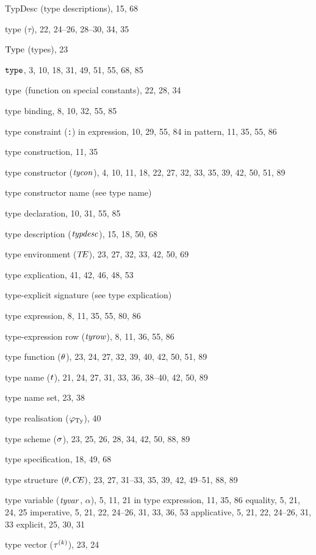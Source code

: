 \begin{theindex}
\item TypDesc (type descriptions), 15, 68
\item type ($\tau$), 22, 24--26, 28--30, 34, 35
\item ${\rm Type}$ (types), 23
\item ${\tt type}$, 3, 10, 18, 31, 49, 51, 55, 68, 85
\item $\mathop{\rm type}\nolimits$ (function on special constants), 22, 28, 34
\item type binding, 8, 10, 32, 55, 85
\item type constraint (\verb+:+) 
\subitem in expression, 10, 29, 55, 84
\subitem in pattern, 11, 35, 55, 86
\item type construction, 11, 35
\item type constructor (${\it tycon}$), 4, 10, 11, 18, 22, 27, 32, 33, 35, 39, 42, 50, 51, 89
\item type constructor name (see type name) 
\item type declaration, 10, 31, 55, 85
\item type description (${\it typdesc}$), 15, 18, 50, 68
\item type environment ($\mbox{$T\!E$}$), 23, 27, 32, 33, 42, 50, 69
\item type explication, 41, 42, 46, 48, 53
\item type-explicit signature (see type explication) 
\item type expression, 8, 11, 35, 55, 80, 86
\item type-expression row (${\it tyrow}$), 8, 11, 36, 55, 86
\item type function ($\theta$), 23, 24, 27, 32, 39, 40, 42, 50, 51, 89
\item type name ($t$), 21, 24, 27, 31, 33, 36, 38--40, 42, 50, 89
\item type name set, 23, 38
\item type realisation ($\varphi_{\rm Ty}$), 40
\item type scheme ($\sigma$), 23, 25, 26, 28, 34, 42, 50, 88, 89
\item type specification, 18, 49, 68
\item type structure $(\theta,\mbox{$C\!E$})$, 23, 27, 31--33, 35, 39, 42, 49--51, 88, 89
\item type variable (${\it tyvar}$, $\alpha$), 5, 11, 21
\subitem in type expression, 11, 35, 86
\subitem equality, 5, 21, 24, 25
\subitem imperative, 5, 21, 22, 24--26, 31, 33, 36, 53
\subitem applicative, 5, 21, 22, 24--26, 31, 33
\subitem explicit, 25, 30, 31
\item type vector ($\mbox{$\tau^{(k)}$}$), 23, 24

\end{theindex}
